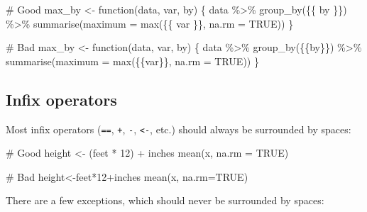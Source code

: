 \documentclass[twoside, pagesize, fontsize=11pt, dvipsnames]{scrreport} %
\newenvironment{Shaded}{\begin{snugshade}}{\end{snugshade}}
\newcommand{\AttributeTok}[1]{\textcolor[rgb]{0.40,0.45,0.13}{#1}}
\newcommand{\CommentTok}[1]{\textcolor[rgb]{0.37,0.37,0.37}{#1}}
\newcommand{\ConstantTok}[1]{\textcolor[rgb]{0.56,0.35,0.01}{#1}}
\newcommand{\ControlFlowTok}[1]{\textcolor[rgb]{0.00,0.23,0.31}{#1}}
\newcommand{\DecValTok}[1]{\textcolor[rgb]{0.68,0.00,0.00}{#1}}
\newcommand{\FunctionTok}[1]{\textcolor[rgb]{0.28,0.35,0.67}{#1}}
\newcommand{\NormalTok}[1]{\textcolor[rgb]{0.00,0.23,0.31}{#1}}
\newcommand{\OtherTok}[1]{\textcolor[rgb]{0.00,0.23,0.31}{#1}}
\newcommand{\SpecialCharTok}[1]{\textcolor[rgb]{0.37,0.37,0.37}{#1}}
\begin{document}
\begin{Shaded}
\begin{Highlighting}[]
\CommentTok{\# Good}
\NormalTok{max\_by }\OtherTok{\textless{}{-}} \ControlFlowTok{function}\NormalTok{(data, var, by) \{}
\NormalTok{  data }\SpecialCharTok{\%\textgreater{}\%}
    \FunctionTok{group\_by}\NormalTok{(\{\{ by \}\}) }\SpecialCharTok{\%\textgreater{}\%}
    \FunctionTok{summarise}\NormalTok{(}\AttributeTok{maximum =} \FunctionTok{max}\NormalTok{(\{\{ var \}\}, }\AttributeTok{na.rm =} \ConstantTok{TRUE}\NormalTok{))}
\NormalTok{\}}

\CommentTok{\# Bad}
\NormalTok{max\_by }\OtherTok{\textless{}{-}} \ControlFlowTok{function}\NormalTok{(data, var, by) \{}
\NormalTok{  data }\SpecialCharTok{\%\textgreater{}\%}
    \FunctionTok{group\_by}\NormalTok{(\{\{by\}\}) }\SpecialCharTok{\%\textgreater{}\%}
    \FunctionTok{summarise}\NormalTok{(}\AttributeTok{maximum =} \FunctionTok{max}\NormalTok{(\{\{var\}\}, }\AttributeTok{na.rm =} \ConstantTok{TRUE}\NormalTok{))}
\NormalTok{\}}
\end{Highlighting}
\end{Shaded}

\hypertarget{infix-operators}{%
\subsection{Infix operators}\label{infix-operators}}

Most infix operators (\texttt{==}, \texttt{+}, \texttt{-},
\texttt{\textless{}-}, etc.) should always be surrounded by spaces:

\begin{Shaded}
\begin{Highlighting}[]
\CommentTok{\# Good}
\NormalTok{height }\OtherTok{\textless{}{-}}\NormalTok{ (feet }\SpecialCharTok{*} \DecValTok{12}\NormalTok{) }\SpecialCharTok{+}\NormalTok{ inches}
\FunctionTok{mean}\NormalTok{(x, }\AttributeTok{na.rm =} \ConstantTok{TRUE}\NormalTok{)}

\CommentTok{\# Bad}
\NormalTok{height}\OtherTok{\textless{}{-}}\NormalTok{feet}\SpecialCharTok{*}\DecValTok{12}\SpecialCharTok{+}\NormalTok{inches}
\FunctionTok{mean}\NormalTok{(x, }\AttributeTok{na.rm=}\ConstantTok{TRUE}\NormalTok{)}
\end{Highlighting}
\end{Shaded}

There are a few exceptions, which should never be surrounded by spaces:
\end{document}
